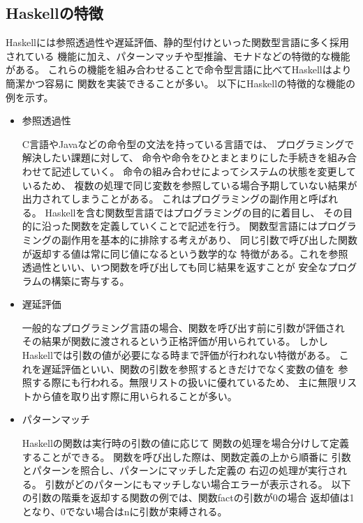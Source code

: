 \documentclass{csspaper}
\begin{document}
      \subsection{Haskellの特徴}
      Haskellには参照透過性や遅延評価、静的型付けといった関数型言語に多く採用されている
      機能に加え、パターンマッチや型推論、モナドなどの特徴的な機能がある。
      これらの機能を組み合わせることで命令型言語に比べてHaskellはより簡潔かつ容易に
      関数を実装できることが多い。
      以下にHaskellの特徴的な機能の例を示す。
      \begin{itemize}
         \item 参照透過性
      
         C言語やJavaなどの命令型の文法を持っている言語では、
         プログラミングで解決したい課題に対して、
         命令や命令をひとまとまりにした手続きを組み合わせて記述していく。
         命令の組み合わせによってシステムの状態を変更しているため、
         複数の処理で同じ変数を参照している場合予期していない結果が出力されてしまうことがある。
         これはプログラミングの副作用と呼ばれる。
         Haskellを含む関数型言語ではプログラミングの目的に着目し、
         その目的に沿った関数を定義していくことで記述を行う。
         関数型言語にはプログラミングの副作用を基本的に排除する考えがあり、
         同じ引数で呼び出した関数が返却する値は常に同じ値になるという数学的な
         特徴がある。これを参照透過性といい、いつ関数を呼び出しても同じ結果を返すことが
         安全なプログラムの構築に寄与する。

         \item 遅延評価
      
         一般的なプログラミング言語の場合、関数を呼び出す前に引数が評価され
         その結果が関数に渡されるという正格評価が用いられている。
         しかしHaskellでは引数の値が必要になる時まで評価が行われない特徴がある。
         これを遅延評価といい、関数の引数を参照するときだけでなく変数の値を
         参照する際にも行われる。無限リストの扱いに優れているため、
         主に無限リストから値を取り出す際に用いられることが多い。

         \item パターンマッチ
         
         Haskellの関数は実行時の引数の値に応じて
         関数の処理を場合分けして定義することができる。
         関数を呼び出した際は、関数定義の上から順番に
         引数とパターンを照合し、パターンにマッチした定義の
         右辺の処理が実行される。
         引数がどのパターンにもマッチしない場合エラーが表示される。
         以下の引数の階乗を返却する関数の例では、関数factの引数が0の場合
         返却値は1となり、0でない場合はnに引数が束縛される。


\end{itemize}
\end{document}
